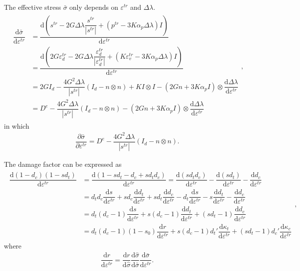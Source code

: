 \documentclass[10pt,fleqn,3p]{elsarticle}
\newcommand*{\md}[1]{\mathrm{d}#1}
\newcommand*{\ddfrac}[2]{\dfrac{\md#1}{\md#2}}
\newcommand*{\pfrac}[2]{\dfrac{\partial#1}{\partial#2}}
\begin{document}
The effective stress $\bar{\sigma}$ only depends on $\varepsilon^{tr}$ and $\Delta\lambda$.
\begin{gather}
\begin{split}
\ddfrac{\bar{\sigma}}{\varepsilon^{tr}}&=\ddfrac{\left(s^{tr}-2G\Delta\lambda\dfrac{s^{tr}}{|s^{tr}|}+(p^{tr}-3K\alpha_p\Delta\lambda)I\right)}{\varepsilon^{tr}}\\
&=\ddfrac{\left(2G\varepsilon_d^{tr}-2G\Delta\lambda\dfrac{\varepsilon_d^{tr}}{|\varepsilon_d^{tr}|}+\left(K\varepsilon_v^{tr}-3K\alpha_p\Delta\lambda\right)I\right)}{\varepsilon^{tr}}\\
&=2GI_d-\dfrac{4G^2\Delta\lambda}{|s^{tr}|}\left(I_d-n\otimes{}n\right)+KI\otimes{}I-\left(2Gn+3K\alpha_pI\right)\otimes\ddfrac{\Delta\lambda}{\varepsilon^{tr}}\\
&=D^e-\dfrac{4G^2\Delta\lambda}{|s^{tr}|}\left(I_d-n\otimes{}n\right)-\left(2Gn+3K\alpha_pI\right)\otimes\ddfrac{\Delta\lambda}{\varepsilon^{tr}}
\end{split},
\end{gather}
in which
\begin{gather}
\pfrac{\bar{\sigma}}{\varepsilon^{tr}}=D^e-\dfrac{4G^2\Delta\lambda}{|s^{tr}|}\left(I_d-n\otimes{}n\right).
\end{gather}

The damage factor can be expressed as
\begin{gather}
\begin{split}
\ddfrac{(1-d_c)(1-sd_t)}{\varepsilon^{tr}}&=\ddfrac{\left(1-sd_t-d_c+sd_td_c\right)}{\varepsilon^{tr}}=\ddfrac{\left(sd_td_c\right)}{\varepsilon^{tr}}-\ddfrac{\left(sd_t\right)}{\varepsilon^{tr}}-\ddfrac{d_c}{\varepsilon^{tr}}\\
&=d_td_c\ddfrac{s}{\varepsilon^{tr}}+sd_c\ddfrac{d_t}{\varepsilon^{tr}}+sd_t\ddfrac{d_c}{\varepsilon^{tr}}-d_t\ddfrac{s}{\varepsilon^{tr}}-s\ddfrac{d_t}{\varepsilon^{tr}}-\ddfrac{d_c}{\varepsilon^{tr}}\\
&=d_t(d_c-1)\ddfrac{s}{\varepsilon^{tr}}+s(d_c-1)\ddfrac{d_t}{\varepsilon^{tr}}+(sd_t-1)\ddfrac{d_c}{\varepsilon^{tr}}\\
&=d_t(d_c-1)(1-s_0)\ddfrac{r}{\varepsilon^{tr}}+s(d_c-1)d_t'\ddfrac{\kappa_t}{\varepsilon^{tr}}+(sd_t-1)d_c'\ddfrac{\kappa_c}{\varepsilon^{tr}}
\end{split},
\end{gather}
where
\begin{gather}
\ddfrac{r}{\varepsilon^{tr}}=\ddfrac{r}{\hat\sigma}\ddfrac{\hat\sigma}{\bar\sigma}\ddfrac{\bar\sigma}{\varepsilon^{tr}}.
\end{gather}
\end{document}

